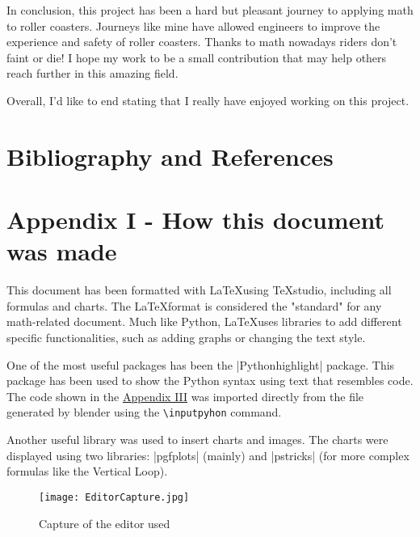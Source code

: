 \documentclass[12pt,twoside,a4paper]{article}
\begin{document}
	In conclusion, this project has been a hard but pleasant journey to applying math to roller coasters. Journeys like mine have allowed engineers to improve the experience and safety of roller coasters. Thanks to math nowadays riders don’t faint or die! I hope my work to be a small contribution that may help others reach further in this amazing field.
	
	Overall, I'd like to end stating that I really have enjoyed working on this project.
	
	\cleardoublepage
	
	\section{Bibliography and References}
		\label{sec:Bibliography}
		\nocite{*}
		\printbibliography[filter=bookorarticle, title= {Books and Articles}]
		\printbibliography[type = {reference}, title = {Math Forums}]
		\printbibliography[type = {report}, title = {Math Forums Questions}]
		\printbibliography[type = {misc}, title = {Videos}]
		\printbibliography[type = {online}, title = {Internet References}]
	
	\cleardoublepage
	
	\section{Appendix I - How this document was made}
		\label{sec:Appendix I}
		This document has been formatted with \LaTeX using TeXstudio, including all formulas and charts. The \LaTeX format is considered the "standard" for any math-related document. Much like Python, \LaTeX uses libraries to add different specific functionalities, such as adding graphs or changing the text style.
		
		One of the most useful packages has been the \pyth|Pythonhighlight| package. This package has been used to show the Python syntax using text that resembles code. The code shown in the \hyperref[sec:Appendix III]{Appendix III} was imported directly from the file generated by blender using the \verb|\inputpyhon| command.
		
		Another useful library was used to insert charts and images. The charts were displayed using two libraries: \pyth|pgfplots| (mainly) and \pyth|pstricks| (for more complex formulas like the Vertical Loop).
		
		\begin{figure}[H]
			\centering
			\texttt{[image: EditorCapture.jpg]}
			\caption{Capture of the editor used}
			\label{fig:LaTeX Editor Capture}
		\end{figure}
	
\end{document}
